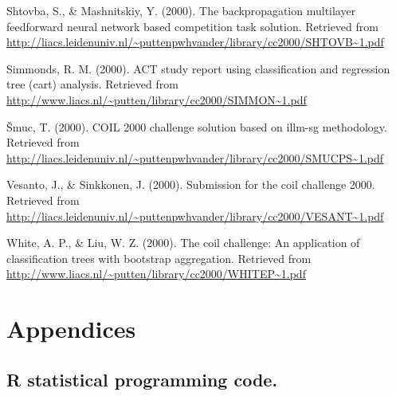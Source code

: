 \documentclass[man]{apa6}
\begin{document}
\leavevmode\hypertarget{ref-Shtovba_Mashnitskiy}{}%
Shtovba, S., \& Mashnitskiy, Y. (2000). The backpropagation multilayer feedforward neural network based competition task solution. Retrieved from \url{http://liacs.leidenuniv.nl/~puttenpwhvander/library/cc2000/SHTOVB~1.pdf}

\leavevmode\hypertarget{ref-Simmonds}{}%
Simmonds, R. M. (2000). ACT study report using classification and regression tree (cart) analysis. Retrieved from \url{http://www.liacs.nl/~putten/library/cc2000/SIMMON~1.pdf}

\leavevmode\hypertarget{ref-Smuc}{}%
Šmuc, T. (2000). COIL 2000 challenge solution based on illm-sg methodology. Retrieved from \url{http://liacs.leidenuniv.nl/~puttenpwhvander/library/cc2000/SMUCPS~1.pdf}

\leavevmode\hypertarget{ref-Vesanto}{}%
Vesanto, J., \& Sinkkonen, J. (2000). Submission for the coil challenge 2000. Retrieved from \url{http://liacs.leidenuniv.nl/~puttenpwhvander/library/cc2000/VESANT~1.pdf}

\leavevmode\hypertarget{ref-White}{}%
White, A. P., \& Liu, W. Z. (2000). The coil challenge: An application of classification trees with bootstrap aggregation. Retrieved from \url{http://www.liacs.nl/~putten/library/cc2000/WHITEP~1.pdf}

\endgroup

\newpage

\hypertarget{appendices}{%
\section{Appendices}\label{appendices}}

\hypertarget{r-statistical-programming-code.}{%
\subsection{R statistical programming code.}\label{r-statistical-programming-code.}}
\end{document}
